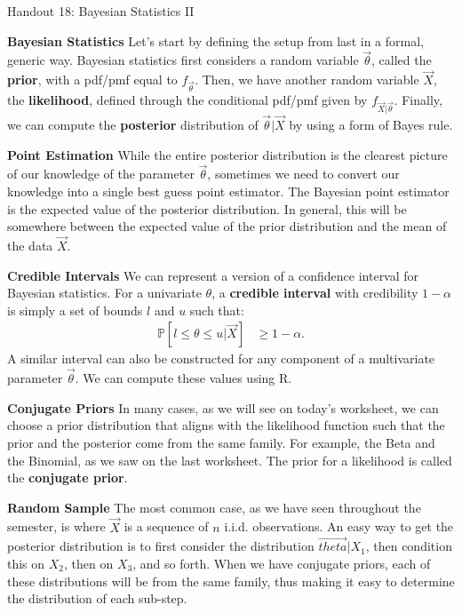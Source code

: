 \documentclass{tufte-handout}
\begin{document}
\justify

{\LARGE Handout 18: Bayesian Statistics II}

\vspace*{18pt}

\noindent
\textbf{Bayesian Statistics} Let's start by defining the setup
from last in a formal, generic way. Bayesian statistics first
considers a random variable $\vec{\theta}$, called the \textbf{prior},
with a pdf/pmf equal to $f_{\vec{\theta}}$. Then, we have another 
random variable $\vec{X}$, the \textbf{likelihood}, defined through
the conditional pdf/pmf given by $f_{\vec{X}|\vec{\theta}}$. Finally,
we can compute the \textbf{posterior} distribution of
$\vec{\theta} | \vec{X}$ by using a form of Bayes rule. 

\vspace*{18pt}

\noindent
\textbf{Point Estimation}  
While the entire posterior distribution is the clearest picture of our
knowledge of the parameter $\vec{\theta}$, sometimes we need to convert our
knowledge into a single best guess point estimator. The
Bayesian point estimator is the expected value of the posterior distribution.
In general, this will be somewhere between the expected value of the prior
distribution and the mean of the data $\vec{X}$.

\vspace*{18pt}

\noindent
\textbf{Credible Intervals}  
We can represent a version of a confidence interval for Bayesian statistics.
For a univariate $\theta$, a \textbf{credible interval} with credibility
$1-\alpha$ is simply a set of bounds $l$ and $u$ such that: 
\begin{align*}
\mathbb{P}[l \leq \theta \leq u | \vec{X}] &\geq 1 - \alpha.
\end{align*}
A similar interval can also be constructed for any component of a multivariate
parameter $\vec{\theta}$. We can compute these values using R.

\vspace*{18pt}

\noindent
\textbf{Conjugate Priors}
In many cases, as we will see on today's worksheet, we can choose a prior
distribution that aligns with the likelihood function such that the prior
and the posterior come from the same family. For example, the Beta and the
Binomial, as we saw on the last worksheet. The prior for a likelihood is 
called the \textbf{conjugate prior}.

\vspace*{18pt}

\noindent
\textbf{Random Sample} The most common case, as we have seen throughout the
semester, is where $\vec{X}$ is a sequence of $n$ i.i.d. observations. An
easy way to get the posterior distribution is to first consider the 
distribution $\vec{theta} | X_1$, then condition this on $X_2$, then on
$X_3$, and so forth. When we have conjugate priors, each of these 
distributions will be from the same family, thus making it easy to determine
the distribution of each sub-step.
\end{document}
